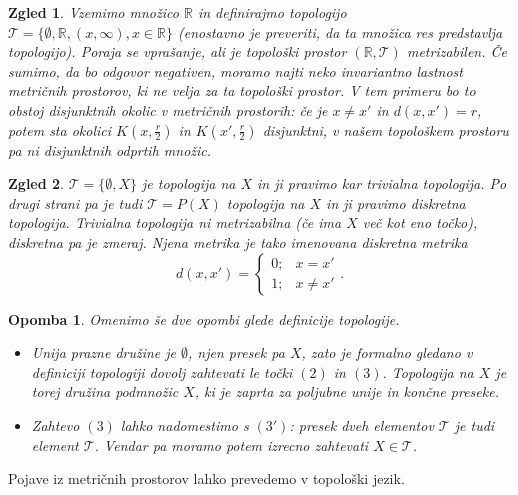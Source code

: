 \documentclass[10pt, a4paper]{article}
\newtheorem*{opomba}{Opomba}
\newtheorem{zgled}{Zgled}[section]
\newcommand{\R}{\mathbb {R}}
\begin{document}
\begin{zgled}
  Vzemimo množico $\R$ in definirajmo topologijo $\mathcal{T} = \{\emptyset, \R, (x, \infty), x\in \R\}$
    (enostavno je preveriti, da ta množica res predstavlja topologijo).
    Poraja se vprašanje, ali je topološki prostor $(\R, \mathcal{T})$ metrizabilen.
    Če sumimo, da bo odgovor negativen, moramo najti neko invariantno lastnost metričnih prostorov, ki ne velja za ta topološki prostor.
    V tem primeru bo to obstoj disjunktnih okolic v metričnih prostorih: če je $x \neq x'$ in $d(x, x') = r$,
    potem sta okolici $K\left(x, \frac{r}{2}\right)$ in $K\left(x', \frac{r}{2}\right)$ disjunktni, v našem topološkem prostoru pa ni disjunktnih odprtih množic.
\end{zgled}

\begin{zgled}
    $\mathcal{T} = \{\emptyset, X\}$ je topologija na $X$ in ji pravimo kar trivialna topologija.
    Po drugi strani pa je tudi $\mathcal{T} = P(X)$ topologija na $X$ in ji pravimo diskretna topologija.
    Trivialna topologija ni metrizabilna (če ima $X$ več kot eno točko), diskretna pa je zmeraj.
    Njena metrika je tako imenovana diskretna metrika $$d(x, x') = \begin{cases}
      0 ;& x = x'\\
      1 ;& x \neq x'
    \end{cases}.$$
\end{zgled}

\begin{opomba}
  Omenimo še dve opombi glede definicije topologije.
  \begin{itemize}
    \item Unija prazne družine je $\emptyset$, njen presek pa $X$,
    zato je formalno gledano v definiciji topologiji dovolj zahtevati le točki $(2)$ in $(3)$.
    Topologija na $X$ je torej družina podmnožic $X$, ki je zaprta za poljubne unije in končne preseke.
    \item Zahtevo $(3)$ lahko nadomestimo s $(3')$: presek dveh elementov $\mathcal{T}$ je tudi element $\mathcal{T}$.
    Vendar pa moramo potem izrecno zahtevati $X \in \mathcal{T}$.
  \end{itemize}
\end{opomba}

Pojave iz metričnih prostorov lahko prevedemo v topološki jezik.
\end{document}
